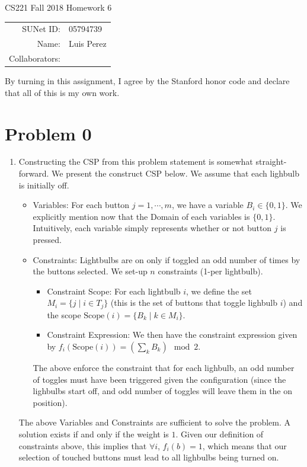 \documentclass[12pt]{article}
\begin{document}
\begin{center}
{\Large CS221 Fall 2018 Homework 6}

\begin{tabular}{rl}
SUNet ID: & 05794739 \\
Name: & Luis Perez \\
Collaborators: &
\end{tabular}
\end{center}

By turning in this assignment, I agree by the Stanford honor code and declare
that all of this is my own work.

\section*{Problem 0}

\begin{enumerate}[label=(\alph*)]
  \item Constructing the CSP from this problem statement is somewhat straight-forward. We present the construct CSP below. We assume that each lighbulb is initially off.
  \begin{itemize}
    \item Variables: For each button $j = 1, \cdots, m$, we have a variable $B_i \in \{0,1\}$. We explicitly mention now that the Domain of each variables is $\{0,1\}$. Intuitively, each variable simply represents whether or not button $j$ is pressed.
    \item Constraints: Lightbulbs are on only if toggled an odd number of times by the buttons selected. We set-up $n$ constraints (1-per lightbulb).
    \begin{itemize}
      \item Constraint Scope: For each lightbulb $i$, we define the set $M_i = \{j \mid i \in T_j \}$ (this is the set of buttons that toggle lighbulb $i$) and the scope $\text{Scope}(i) = \{B_k \mid k \in M_i \}$.
      \item Constraint Expression: We then have the constraint expression given by $f_i(\text{Scope}(i)) = \left(\sum_{k} B_k\right) \mod 2$. 
    \end{itemize}
    The above enforce the constraint that for each lighbulb, an odd number of toggles must have been triggered given the configuration (since the lighbulbs start off, and odd number of toggles will leave them in the on position).
  \end{itemize}
  The above Variables and Constraints are sufficient to solve the problem. A solution exists if and only if the weight is $1$. Given our definition of constraints above, this implies that $\forall i$, $f_i(b) = 1$, which means that our selection of touched buttons must lead to all lighbulbs being turned on.


\end{enumerate}
\end{document}
